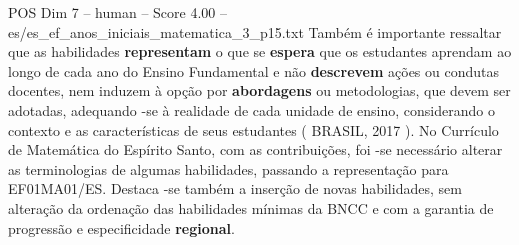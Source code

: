 \begin{textsample}{POS Dim 7 – human – Score 4.00 – es/es\_ef\_anos\_iniciais\_matematica\_3\_p15.txt}  \label{ex:f7_pos_005}
Também é importante ressaltar que as habilidades \textbf{representam} o que se \textbf{espera} que os estudantes aprendam ao longo de cada ano do Ensino Fundamental e não \textbf{descrevem} ações ou condutas docentes, nem induzem à opção por \textbf{abordagens} ou metodologias, que devem ser adotadas, adequando -se à realidade de cada unidade de ensino, considerando o contexto e as características de seus estudantes ( BRASIL, 2017 ).
No Currículo de Matemática do Espírito Santo, com as contribuições, foi -se necessário alterar as terminologias de algumas habilidades, passando a representação para EF01MA01/ES.
Destaca -se também a inserção de novas habilidades, sem alteração da ordenação das habilidades mínimas da BNCC e com a garantia de progressão e especificidade \textbf{regional}.

\end{textsample}
